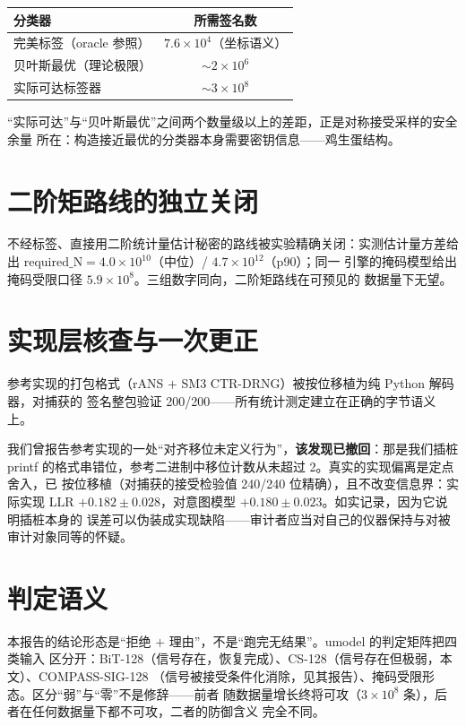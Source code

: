 \documentclass[UTF8,11pt,a4paper]{ctexart}
\begin{document}
\begin{table}[htbp]\centering\small
\begin{tabular}{@{}lc@{}}
\toprule
分类器 & 所需签名数 \\
\midrule
完美标签（oracle 参照） & $7.6\times10^4$（坐标语义） \\
贝叶斯最优（理论极限） & ${\sim}2\times10^6$ \\
实际可达标签器 & ${\sim}3\times10^8$ \\
\bottomrule
\end{tabular}
\end{table}

``实际可达''与``贝叶斯最优''之间两个数量级以上的差距，正是对称接受采样的安全余量
所在：构造接近最优的分类器本身需要密钥信息——鸡生蛋结构。

\section{二阶矩路线的独立关闭}

不经标签、直接用二阶统计量估计秘密的路线被实验精确关闭：实测估计量方差给出
$\mathrm{required\_N} = 4.0\times10^{10}$（中位）/ $4.7\times10^{12}$（p90）；同一
引擎的掩码模型给出掩码受限口径 $5.9\times10^8$。三组数字同向，二阶矩路线在可预见的
数据量下无望。

\section{实现层核查与一次更正}

参考实现的打包格式（rANS $+$ SM3 CTR-DRNG）被按位移植为纯 Python 解码器，对捕获的
签名整包验证 200/200——所有统计测定建立在正确的字节语义上。

我们曾报告参考实现的一处``对齐移位未定义行为''，\textbf{该发现已撤回}：那是我们插桩
printf 的格式串错位，参考二进制中移位计数从未超过 2。真实的实现偏离是定点舍入，已
按位移植（对捕获的接受检验值 240/240 位精确），且不改变信息界：实际实现 LLR
$+0.182 \pm 0.028$，对意图模型 $+0.180 \pm 0.023$。如实记录，因为它说明插桩本身的
误差可以伪装成实现缺陷——审计者应当对自己的仪器保持与对被审计对象同等的怀疑。

\section{判定语义}

本报告的结论形态是``拒绝 $+$ 理由''，不是``跑完无结果''。umodel 的判定矩阵把四类输入
区分开：BiT-128（信号存在，恢复完成）、CS-128（信号存在但极弱，本文）、COMPASS-SIG-128
（信号被接受条件化消除，见其报告）、掩码受限形态。区分``弱''与``零''不是修辞——前者
随数据量增长终将可攻（$3\times10^8$ 条），后者在任何数据量下都不可攻，二者的防御含义
完全不同。
\end{document}
